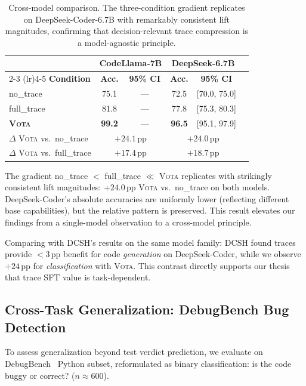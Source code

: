 \documentclass[11pt,a4paper]{article}
\newcommand{\vota}{\textsc{Vota}}
\newcommand{\pp}{\,\text{pp}}
\begin{document}
\begin{table}[t]
\centering
\small
\begin{tabular}{lccccc}
\toprule
& \multicolumn{2}{c}{\textbf{CodeLlama-7B}} & \multicolumn{2}{c}{\textbf{DeepSeek-6.7B}} \\
\cmidrule(lr){2-3} \cmidrule(lr){4-5}
\textbf{Condition} & \textbf{Acc.} & \textbf{95\% CI} & \textbf{Acc.} & \textbf{95\% CI} \\
\midrule
no\_trace & 75.1 & --- & 72.5 & [70.0, 75.0] \\
full\_trace & 81.8 & --- & 77.8 & [75.3, 80.3] \\
\textbf{\vota{}} & \textbf{99.2} & --- & \textbf{96.5} & [95.1, 97.9] \\
\midrule
$\Delta$ \vota{} vs.\ no\_trace & \multicolumn{2}{c}{$+24.1\pp$} & \multicolumn{2}{c}{$+24.0\pp$} \\
$\Delta$ \vota{} vs.\ full\_trace & \multicolumn{2}{c}{$+17.4\pp$} & \multicolumn{2}{c}{$+18.7\pp$} \\
\bottomrule
\end{tabular}
\caption{Cross-model comparison. The three-condition gradient replicates on DeepSeek-Coder-6.7B with remarkably consistent lift magnitudes, confirming that decision-relevant trace compression is a model-agnostic principle.}
\label{tab:crossmodel}
\end{table}

The gradient no\_trace $<$ full\_trace $\ll$ \vota{} replicates with strikingly consistent lift magnitudes: $+24.0\pp$ \vota{} vs.\ no\_trace on both models.
DeepSeek-Coder's absolute accuracies are uniformly lower (reflecting different base capabilities), but the relative pattern is preserved.
This result elevates our findings from a single-model observation to a cross-model principle.

Comparing with DCSH's results on the same model family: DCSH found traces provide $<$3$\pp$ benefit for code \emph{generation} on DeepSeek-Coder, while we observe $+24\pp$ for \emph{classification} with \vota{}.
This contrast directly supports our thesis that trace SFT value is task-dependent.

\subsection{Cross-Task Generalization: DebugBench Bug Detection}
\label{sec:debugbench}

To assess generalization beyond test verdict prediction, we evaluate on DebugBench~\cite{debugbench2024} Python subset, reformulated as binary classification: is the code buggy or correct? ($n \approx 600$).
\end{document}
